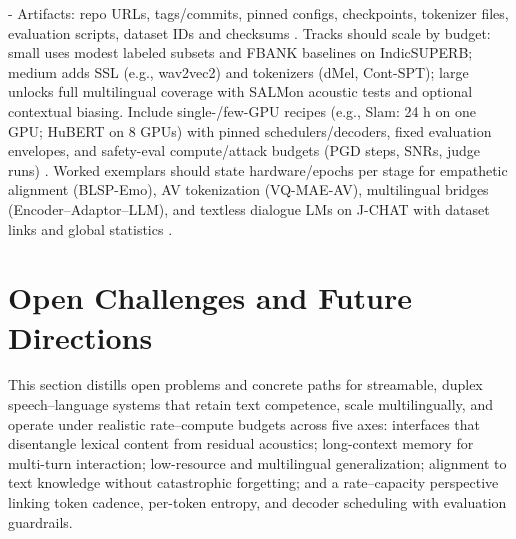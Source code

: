\documentclass{article}
\begin{document}
- Artifacts: repo URLs, tags/commits, pinned configs, checkpoints, tokenizer files, evaluation scripts, dataset IDs and checksums \cite{sun2025llasofoundationalframeworkreproduciblere,vashishth2024stabspeechtokenizerassessmentbenchmark,maimon2025salmonsuiteacousticlanguagemodelevaluati}.
Tracks should scale by budget: small uses modest labeled subsets and FBANK baselines on IndicSUPERB; medium adds SSL (e.g., wav2vec2) and tokenizers (dMel, Cont-SPT); large unlocks full multilingual coverage with SALMon acoustic tests and optional contextual biasing. Include single-/few-GPU recipes (e.g., Slam: 24 h on one GPU; HuBERT on 8 GPUs) with pinned schedulers/decoders, fixed evaluation envelopes, and safety-eval compute/attack budgets (PGD steps, SNRs, judge runs) \cite{bai2025dmelspeechtokenizationmadesimple,li2025continuousspeechtokenizertext,maimon2025salmonsuiteacousticlanguagemodelevaluati,maimon2025slammingtrainingspeechlanguagemodelonegp,chen2023reducingbarriersselfsupervisedlearninghu,peri2024speechguardexploringadversarialrobustnes}. Worked exemplars should state hardware/epochs per stage for empathetic alignment (BLSP-Emo), AV tokenization (VQ-MAE-AV), multilingual bridges (Encoder--Adaptor--LLM), and textless dialogue LMs on J-CHAT with dataset links and global statistics \cite{wang2024blspemotowardsempatheticlargespeechlangu,sadok2025vectorquantizedmaskedautoencoderaudiovis,li2025seewossubmissionmlcslmlessonslearnedspee,nakata2024jchatjapaneselargescalespokendialoguecor}.

















\section{Open Challenges and Future Directions} \label{sec:Open Challenges and Future Directions}

This section distills open problems and concrete paths for streamable, duplex speech--language systems that retain text competence, scale multilingually, and operate under realistic rate--compute budgets across five axes: interfaces that disentangle lexical content from residual acoustics; long-context memory for multi-turn interaction; low-resource and multilingual generalization; alignment to text knowledge without catastrophic forgetting; and a rate--capacity perspective linking token cadence, per-token entropy, and decoder scheduling with evaluation guardrails.
\end{document}
